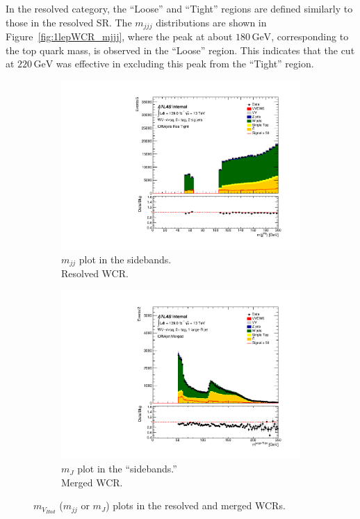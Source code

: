 In the resolved category, the ``Loose'' and ``Tight'' regions are defined similarly to those in the resolved SR. The $m_{jjj}$ distributions are shown in Figure~\ref{fig:1lepWCR_mjjj}, where the peak at about $180\,\si{\GeV}$, corresponding to the top quark mass, is observed in the ``Loose'' region. This indicates that the cut at $220\,\si{\GeV}$ was effective in excluding this peak from the ``Tight'' region.

\begin{figure}[ht]
    \centering
    \begin{subfigure}{0.32\textwidth}
        \includegraphics[width=\linewidth]{figures/CRPlots/CRWjets_Res_Tight/stacked_plot_Dijet_m.pdf}
        \caption{$m_{jj}$ plot in the sidebands.\\ \hspace*{1.5cm}Resolved WCR.}
        \label{fig:1lepMVHadResCR}
    \end{subfigure}
    \begin{subfigure}{0.32\textwidth}
        \includegraphics[width=\linewidth]{figures/CRPlots/CRWjets100/stacked_plot_fatJ_m.pdf}
        \caption{$m_{J}$ plot in the ``sidebands.''\\ \hspace*{1.5cm}Merged WCR.}
        \label{fig:1lepMVHadMerCR}
    \end{subfigure}
    \caption{$m_{V_{Had}}$ ($m_{jj}$ or $m_{J}$) plots in the resolved and merged WCRs.}
    \label{fig:1lepMVHad}
\end{figure}


